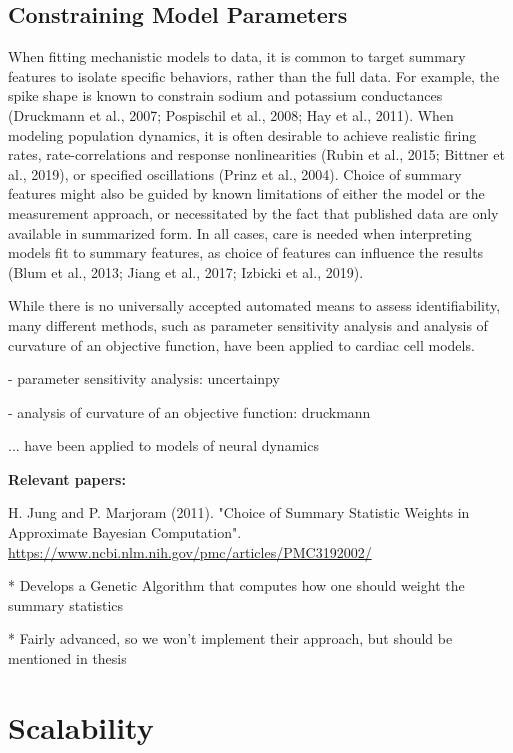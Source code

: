 \subsection{Constraining Model Parameters}


When fitting mechanistic models to data, it is common to target summary features to isolate specific behaviors, rather than the full data. For example, the spike shape is known to constrain sodium and potassium conductances (Druckmann et al., 2007; Pospischil et al., 2008; Hay et al., 2011). When modeling population dynamics, it is often desirable to achieve realistic firing rates, rate-correlations and response nonlinearities (Rubin et al., 2015; Bittner et al., 2019), or specified oscillations (Prinz et al., 2004). Choice of summary features might also be guided by known limitations of either the model or the measurement approach, or necessitated by the fact that published data are only available in summarized form.  In all cases, care is needed when interpreting models fit to summary features, as choice of features can influence the results (Blum et al., 2013; Jiang et al., 2017; Izbicki et al., 2019).


While there is no universally accepted automated means to assess identifiability, many different methods, such as parameter sensitivity analysis and analysis of curvature of an objective function, have been applied to cardiac cell models.   


- parameter sensitivity analysis: uncertainpy 

- analysis of curvature of an objective function: druckmann

... have been applied to models of neural dynamics

\textbf{Relevant papers:}

H. Jung and P. Marjoram (2011). "Choice of Summary Statistic Weights in Approximate Bayesian Computation". \url{https://www.ncbi.nlm.nih.gov/pmc/articles/PMC3192002/}

* Develops a Genetic Algorithm that computes how one should weight the summary statistics 

* Fairly advanced, so we won't implement their approach, but should be mentioned in thesis

\section{Scalability}

